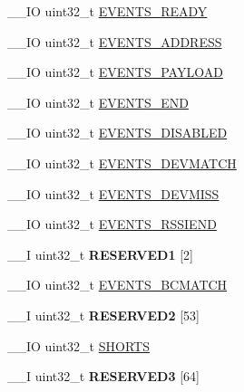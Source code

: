 \begin{DoxyCompactItemize}
\item 
\+\_\+\+\_\+\+I\+O uint32\+\_\+t \hyperlink{struct_n_r_f___r_a_d_i_o___type_a7b3e8b60fc7fabb807b8ac1bfe552714}{E\+V\+E\+N\+T\+S\+\_\+\+R\+E\+A\+D\+Y}
\item 
\+\_\+\+\_\+\+I\+O uint32\+\_\+t \hyperlink{struct_n_r_f___r_a_d_i_o___type_a18324606ddb936cf23259c2776773fa8}{E\+V\+E\+N\+T\+S\+\_\+\+A\+D\+D\+R\+E\+S\+S}
\item 
\+\_\+\+\_\+\+I\+O uint32\+\_\+t \hyperlink{struct_n_r_f___r_a_d_i_o___type_ad5e522d8684b819e46f0cba4c0f03857}{E\+V\+E\+N\+T\+S\+\_\+\+P\+A\+Y\+L\+O\+A\+D}
\item 
\+\_\+\+\_\+\+I\+O uint32\+\_\+t \hyperlink{struct_n_r_f___r_a_d_i_o___type_ae7987c5025d592672400debbeaf8e416}{E\+V\+E\+N\+T\+S\+\_\+\+E\+N\+D}
\item 
\+\_\+\+\_\+\+I\+O uint32\+\_\+t \hyperlink{struct_n_r_f___r_a_d_i_o___type_ad72d919d6a0448bb4087df0fc2230e78}{E\+V\+E\+N\+T\+S\+\_\+\+D\+I\+S\+A\+B\+L\+E\+D}
\item 
\+\_\+\+\_\+\+I\+O uint32\+\_\+t \hyperlink{struct_n_r_f___r_a_d_i_o___type_aaedf67fbb20b97cd8eb0aa6522f82187}{E\+V\+E\+N\+T\+S\+\_\+\+D\+E\+V\+M\+A\+T\+C\+H}
\item 
\+\_\+\+\_\+\+I\+O uint32\+\_\+t \hyperlink{struct_n_r_f___r_a_d_i_o___type_af7e355d88e34e3e56b1ebb482edfbadb}{E\+V\+E\+N\+T\+S\+\_\+\+D\+E\+V\+M\+I\+S\+S}
\item 
\+\_\+\+\_\+\+I\+O uint32\+\_\+t \hyperlink{struct_n_r_f___r_a_d_i_o___type_a59cbe746bb22676c4e160f25297c0927}{E\+V\+E\+N\+T\+S\+\_\+\+R\+S\+S\+I\+E\+N\+D}
\item 
\hypertarget{struct_n_r_f___r_a_d_i_o___type_acbca5ca0a7522d9ae297449194ba36ca}{}\+\_\+\+\_\+\+I uint32\+\_\+t {\bfseries R\+E\+S\+E\+R\+V\+E\+D1} \mbox{[}2\mbox{]}\label{struct_n_r_f___r_a_d_i_o___type_acbca5ca0a7522d9ae297449194ba36ca}

\item 
\+\_\+\+\_\+\+I\+O uint32\+\_\+t \hyperlink{struct_n_r_f___r_a_d_i_o___type_a0f00116c5bf150e53e499ce5f8fca7a5}{E\+V\+E\+N\+T\+S\+\_\+\+B\+C\+M\+A\+T\+C\+H}
\item 
\hypertarget{struct_n_r_f___r_a_d_i_o___type_a7e7a4129cd59165e49b37bc3bb22717b}{}\+\_\+\+\_\+\+I uint32\+\_\+t {\bfseries R\+E\+S\+E\+R\+V\+E\+D2} \mbox{[}53\mbox{]}\label{struct_n_r_f___r_a_d_i_o___type_a7e7a4129cd59165e49b37bc3bb22717b}

\item 
\+\_\+\+\_\+\+I\+O uint32\+\_\+t \hyperlink{struct_n_r_f___r_a_d_i_o___type_aa927e188c809a89c048adfaf79ddabfb}{S\+H\+O\+R\+T\+S}
\item 
\hypertarget{struct_n_r_f___r_a_d_i_o___type_a6f97869f24a9f46f1dd433856729a437}{}\+\_\+\+\_\+\+I uint32\+\_\+t {\bfseries R\+E\+S\+E\+R\+V\+E\+D3} \mbox{[}64\mbox{]}\label{struct_n_r_f___r_a_d_i_o___type_a6f97869f24a9f46f1dd433856729a437}


\end{DoxyCompactItemize}
